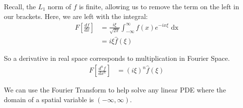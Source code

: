 Recall, the $L_1$ norm of $f$ is finite, allowing us to remove the term on the left in our brackets. Here, we are left with the integral:
%
\begin{align}
  F\left[\frac{df}{dx}\right] & = \frac{i \xi}{\sqrt{2 \pi}} \int^\infty_{-\infty} f(x) e^{-i x \xi} \text{ dx}\\
  & = i \xi \hat f(\xi)
\end{align}

So a derivative in real space corresponds to multiplication in Fourier Space.
%
\begin{align}
  F\left[ \frac{d^nf}{dx^n} \right] & = (i \xi)^n \hat f(\xi)
\end{align}

We can use the Fourier Transform to help solve any linear PDE where the domain of a spatial variable is $(-\infty, \infty)$.
